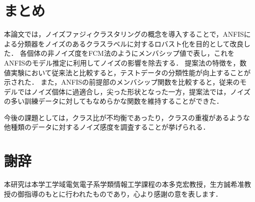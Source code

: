 \documentclass{ujarticle}
\begin{document}
\section{まとめ}

本論文では，ノイズファジィクラスタリングの概念を導入することで，ANFISによる分類器をノイズのあるクラスラベルに対するロバスト化を目的として改良した．
各個体の非ノイズ度をFCM法のようにメンバシップ値で表し，これをANFISのモデル推定に利用してノイズの影響を除去する．
提案法の特徴を，数値実験において従来法と比較すると，テストデータの分類性能が向上することが示された．
また，ANFISの前提部のメンバシップ関数を比較すると，従来のモデルではノイズ個体に過適合し，尖った形状となった一方，提案法では，ノイズの多い訓練データに対してもなめらかな関数を維持することができた．

今後の課題としては，クラス比が不均衡であったり，クラスの重複があるような他種類のデータに対するノイズ感度を調査することが挙げられる．

\section*{謝辞}

本研究は本学工学域電気電子系学類情報工学課程の本多克宏教授，生方誠希准教授の御指導のもとに行われたものであり，心より感謝の意を表します．
\end{document}
